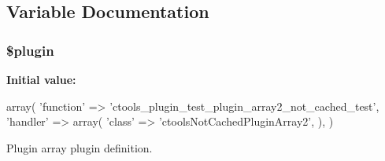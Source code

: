 \subsection{Variable Documentation}
\hypertarget{not__cached_2plugin__array2_8inc_ada8a7130088351710bb02ed622d6bf65}{
\subsubsection[{\$plugin}]{\setlength{\rightskip}{0pt plus 5cm}\$plugin}}
\label{not__cached_2plugin__array2_8inc_ada8a7130088351710bb02ed622d6bf65}
{\bfseries Initial value:}
\begin{DoxyCode}
 array(
  'function' => 'ctools_plugin_test_plugin_array2_not_cached_test',
  'handler' => array(
    'class' => 'ctoolsNotCachedPluginArray2',
  ),
)
\end{DoxyCode}
Plugin array plugin definition. 